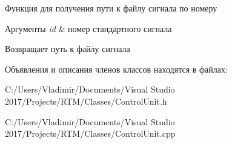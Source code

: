 Функция для получения пути к файлу сигнала по номеру 
\begin{DoxyParams}{Аргументы}
{\em id} & номер стандартного сигнала \\
\hline
\end{DoxyParams}
\begin{DoxyReturn}{Возвращает}
путь к файлу сигнала 
\end{DoxyReturn}


Объявления и описания членов классов находятся в файлах\+:\begin{DoxyCompactItemize}
\item 
C\+:/\+Users/\+Vladimir/\+Documents/\+Visual Studio 2017/\+Projects/\+R\+T\+M/\+Classes/Control\+Unit.\+h\item 
C\+:/\+Users/\+Vladimir/\+Documents/\+Visual Studio 2017/\+Projects/\+R\+T\+M/\+Classes/Control\+Unit.\+cpp\end{DoxyCompactItemize}
